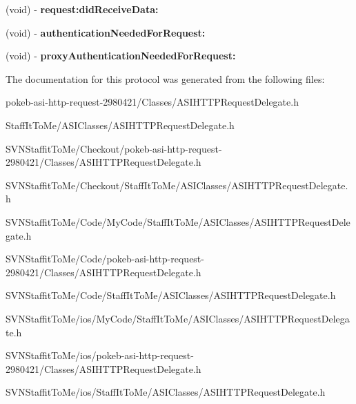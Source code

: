 \begin{DoxyCompactItemize}
\item 
\hypertarget{protocol_a_s_i_h_t_t_p_request_delegate-p_a0d288685ae534bc21ba4c359b6e69542}{
(void) -\/ {\bfseries request\-:did\-Receive\-Data\-:}}
\label{protocol_a_s_i_h_t_t_p_request_delegate-p_a0d288685ae534bc21ba4c359b6e69542}

\item 
\hypertarget{protocol_a_s_i_h_t_t_p_request_delegate-p_aa05e605eb51abc5fc336517aca3cdf34}{
(void) -\/ {\bfseries authentication\-Needed\-For\-Request\-:}}
\label{protocol_a_s_i_h_t_t_p_request_delegate-p_aa05e605eb51abc5fc336517aca3cdf34}

\item 
\hypertarget{protocol_a_s_i_h_t_t_p_request_delegate-p_a7c6a0c31932148a3d87bd57662af5891}{
(void) -\/ {\bfseries proxy\-Authentication\-Needed\-For\-Request\-:}}
\label{protocol_a_s_i_h_t_t_p_request_delegate-p_a7c6a0c31932148a3d87bd57662af5891}

\end{DoxyCompactItemize}


\-The documentation for this protocol was generated from the following files\-:\begin{DoxyCompactItemize}
\item 
pokeb-\/asi-\/http-\/request-\/2980421/\-Classes/\-A\-S\-I\-H\-T\-T\-P\-Request\-Delegate.\-h\item 
\-Staff\-It\-To\-Me/\-A\-S\-I\-Classes/\-A\-S\-I\-H\-T\-T\-P\-Request\-Delegate.\-h\item 
\-S\-V\-N\-Staffit\-To\-Me/\-Checkout/pokeb-\/asi-\/http-\/request-\/2980421/\-Classes/\-A\-S\-I\-H\-T\-T\-P\-Request\-Delegate.\-h\item 
\-S\-V\-N\-Staffit\-To\-Me/\-Checkout/\-Staff\-It\-To\-Me/\-A\-S\-I\-Classes/\-A\-S\-I\-H\-T\-T\-P\-Request\-Delegate.\-h\item 
\-S\-V\-N\-Staffit\-To\-Me/\-Code/\-My\-Code/\-Staff\-It\-To\-Me/\-A\-S\-I\-Classes/\-A\-S\-I\-H\-T\-T\-P\-Request\-Delegate.\-h\item 
\-S\-V\-N\-Staffit\-To\-Me/\-Code/pokeb-\/asi-\/http-\/request-\/2980421/\-Classes/\-A\-S\-I\-H\-T\-T\-P\-Request\-Delegate.\-h\item 
\-S\-V\-N\-Staffit\-To\-Me/\-Code/\-Staff\-It\-To\-Me/\-A\-S\-I\-Classes/\-A\-S\-I\-H\-T\-T\-P\-Request\-Delegate.\-h\item 
\-S\-V\-N\-Staffit\-To\-Me/ios/\-My\-Code/\-Staff\-It\-To\-Me/\-A\-S\-I\-Classes/\-A\-S\-I\-H\-T\-T\-P\-Request\-Delegate.\-h\item 
\-S\-V\-N\-Staffit\-To\-Me/ios/pokeb-\/asi-\/http-\/request-\/2980421/\-Classes/\-A\-S\-I\-H\-T\-T\-P\-Request\-Delegate.\-h\item 
\-S\-V\-N\-Staffit\-To\-Me/ios/\-Staff\-It\-To\-Me/\-A\-S\-I\-Classes/\-A\-S\-I\-H\-T\-T\-P\-Request\-Delegate.\-h\end{DoxyCompactItemize}
